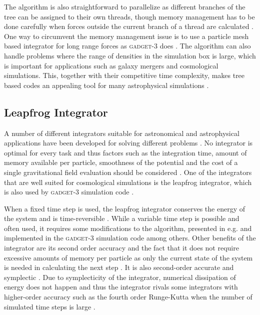 \documentclass[english, twoside]{HYgradu}
\begin{document}
The algorithm is also straightforward to parallelize as different branches of the tree can be assigned to their own threads, though memory management has to be done carefully when forces outside the current branch of a thread are calculated \citep{binney2008galactic}. One way to circumvent the memory management issue is to use a particle mesh based integrator for long range forces as \textsc{gadget-3} does \citep{springel2005cosmological}. The algorithm can also handle problems where the range of densities in the simulation box is large, which is important for applications such as galaxy mergers and cosmological simulations. This, together with their competitive time complexity, makes tree based codes an appealing tool for many astrophysical simulations \citep{binney2008galactic}.


\subsection{Leapfrog Integrator} \label{sect:leapfrog}
A number of different integrators suitable for astronomical and astrophysical applications have been developed  for solving different problems \citep{binney2008galactic}. No integrator is optimal for every task and thus factors such as the integration time, amount of memory available per particle, smoothness of the potential and the cost of a single gravitational field evaluation should be considered \citep{binney2008galactic}. One of the integrators that are well suited for cosmological simulations is the leapfrog integrator, which is also used by \textsc{gadget-3} simulation code \citep{springel2005cosmological}.

When a fixed time step is used, the leapfrog integrator conserves the energy of the system and is time-reversible \citep{binney2008galactic}. While a variable time step is possible and often used, it requires some modifications to the algorithm, presented in e.g. \citet{springel2005cosmological} and implemented in the \textsc{gadget-3} simulation code among others. Other benefits of the integrator are its second order accuracy and the fact that it does not require excessive amounts of memory per particle as only the current state of the system is needed in calculating the next step \citep{binney2008galactic}. It is also second-order accurate and symplectic \citep{binney2008galactic}. Due to symplecticity of the integrator, numerical dissipation of energy does not happen and thus the integrator rivals some integrators with higher-order accuracy such as the fourth order Runge-Kutta when the number of simulated time steps is large \citep{binney2008galactic}.
\end{document}

